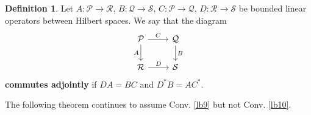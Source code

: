 \documentclass[11pt,b5paper,notitlepage]{article}
\theoremstyle{definition}
\newtheorem{df}{Definition}[section]
\theoremstyle{plain}
\newcommand{\mc}{\mathcal}
\numberwithin{equation}{section}
\begin{document}
\begin{df}
Let $A:\mc P\rightarrow\mc R$, $B:\mc Q\rightarrow\mc S$, $C:\mc P\rightarrow \mc Q$, $D:\mc R\rightarrow\mc S$ be bounded linear operators between Hilbert spaces. We say that the diagram
\begin{equation*}
\begin{tikzcd}
\mc P \arrow[r,"C"] \arrow[d,"A"'] & \mc Q \arrow[d,"B"] \\
\mc R \arrow[r,"D"]           & \mc S        
\end{tikzcd}
\end{equation*}
\textbf{commutes adjointly} if $DA=BC$ and $D^*B=AC^*$.
\end{df}



The following theorem continues to assume Conv. \ref{lb9} but not Conv. \ref{lb10}.
\end{document}
